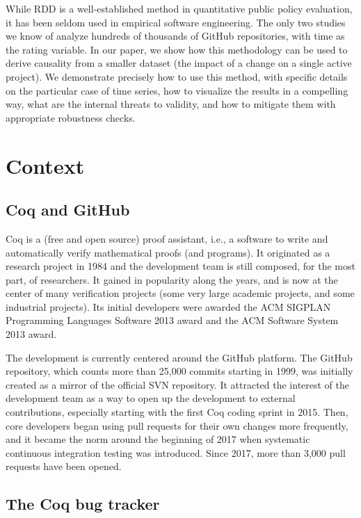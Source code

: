 \documentclass[conference]{IEEEtran}
\begin{document}
While RDD is a well-established method in quantitative public policy evaluation, it has been seldom used in empirical software engineering.
The only two studies we know of \cite{zhao2017impact,trockman2018adding} analyze hundreds of thousands of GitHub repositories, with time as the rating variable.
In our paper, we show how this methodology can be used to derive causality from a smaller dataset (the impact of a change on a single active project).
We demonstrate precisely how to use this method, with specific details on the particular case of time series, how to visualize the results in a compelling way, what are the internal threats to validity, and how to mitigate them with appropriate robustness checks.

\section{Context}

\label{context}

\subsection{Coq and GitHub}
Coq is a (free and open source) proof assistant, i.e., a software to write and automatically verify mathematical proofs (and programs). It originated as a research project in 1984 and the development team is still composed, for the most part, of researchers. It gained in popularity along the years, and is now at the center of many verification projects (some very large academic projects, and some industrial projects). Its initial developers were awarded  the ACM SIGPLAN Programming Languages Software 2013 award and the ACM Software System 2013 award.

The development is currently centered around the GitHub platform.
The GitHub repository, which counts more than 25,000 commits starting in 1999, was initially created as a mirror of the official SVN repository.
It attracted the interest of the development team as a way to open up the development to external contributions, especially starting with the first Coq coding sprint in 2015.
Then, core developers began using pull requests for their own changes more frequently, and it became the norm around the beginning of 2017 when systematic continuous integration testing was introduced. Since 2017, more than 3,000 pull requests have been opened.

\subsection{The Coq bug tracker}
\end{document}
